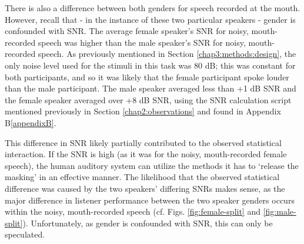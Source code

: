 There is also a difference between both genders for speech recorded at the mouth.
However, recall that - in the instance of these two particular speakers - gender is confounded with SNR.  The average female speaker's SNR for noisy, mouth-recorded speech was higher than the male speaker's SNR for noisy, mouth-recorded speech.  As previously mentioned in Section \ref{chap3:methods:design}, the only noise level used for the stimuli in this task was 80 dB; this was constant for both participants, and so it was likely that the female participant spoke louder than the male participant.  The male speaker averaged less than +1 dB SNR and the female speaker averaged over +8 dB SNR, using the SNR calculation script mentioned previously in Section \ref{chap2:observations} and found in Appendix B\ref{appendixB}.

This difference in SNR likely partially contributed to the observed statistical interaction.  If the SNR is high (as it was for the noisy, mouth-recorded female speech), the human auditory system can utilize the methods it has to `release the masking' in an effective manner.  The likelihood that the observed statistical difference was caused by the two speakers' differing SNRs makes sense, as the major difference in listener performance between the two speaker genders occurs within the noisy, mouth-recorded speech (cf. Figs. \ref{fig:female-split} and \ref{fig:male-split}).  Unfortunately, as gender is confounded with SNR, this can only be speculated.



